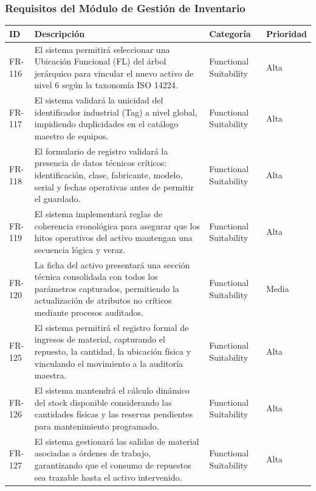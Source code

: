 \subsubsection{Requisitos del Módulo de Gestión de Inventario}
\footnotesize
\begin{longtable}{>{\raggedright\arraybackslash}p{} >{\raggedright\arraybackslash}p{} >{\raggedright\arraybackslash}p{} >{\raggedright\arraybackslash}p{}}
\toprule
\rowcolor{gray!15}\textbf{ID} & \textbf{Descripción} & \textbf{Categoría} & \textbf{Prioridad} \\ \midrule
\endhead
FR-116 & El sistema permitirá seleccionar una Ubicación Funcional (FL) del árbol jerárquico para vincular el nuevo activo de nivel 6 según la taxonomía ISO 14224. & Functional Suitability & Alta \\
FR-117 & El sistema validará la unicidad del identificador industrial (Tag) a nivel global, impidiendo duplicidades en el catálogo maestro de equipos. & Functional Suitability & Alta \\
FR-118 & El formulario de registro validará la presencia de datos técnicos críticos: identificación, clase, fabricante, modelo, serial y fechas operativas antes de permitir el guardado. & Functional Suitability & Alta \\
FR-119 & El sistema implementará reglas de coherencia cronológica para asegurar que los hitos operativos del activo mantengan una secuencia lógica y veraz. & Functional Suitability & Alta \\
FR-120 & La ficha del activo presentará una sección técnica consolidada con todos los parámetros capturados, permitiendo la actualización de atributos no críticos mediante procesos auditados. & Functional Suitability & Media \\
FR-125 & El sistema permitirá el registro formal de ingresos de material, capturando el repuesto, la cantidad, la ubicación física y vinculando el movimiento a la auditoría maestra. & Functional Suitability & Alta \\
FR-126 & El sistema mantendrá el cálculo dinámico del stock disponible considerando las cantidades físicas y las reservas pendientes para mantenimiento programado. & Functional Suitability & Alta \\
FR-127 & El sistema gestionará las salidas de material asociadas a órdenes de trabajo, garantizando que el consumo de repuestos sea trazable hasta el activo intervenido. & Functional Suitability & Alta \\

\end{longtable}
